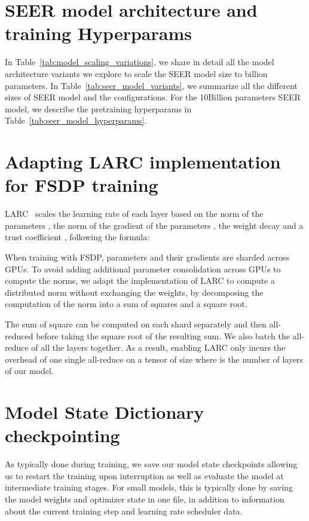 \documentclass[10pt,twocolumn,letterpaper]{article}
\begin{document}
\section{SEER model architecture and training Hyperparams}
\label{sec:appendix_models_seer}

In Table~\ref{tab:model_scaling_variations}, we share in detail all the model architecture variants we explore to scale the SEER model size to billion parameters. In Table~\ref{tab:seer_model_variants}, we summarize all the different sizes of SEER model and the configurations. For the 10Billion parameters SEER model, we describe the pretraining hyperparams in Table~\ref{tab:seer_model_hyperparams}.



\section{Adapting LARC implementation for FSDP training}
\label{sec:appendix_larc_adaptation}

LARC~\cite{you2017large} scales the learning rate of each layer  based on the norm of the parameters , the norm of the gradient of the parameters , the weight decay  and a trust coefficient , following the formula:



When training with FSDP, parameters and their gradients are sharded across GPUs. To avoid adding additional parameter consolidation across GPUs to compute the norms, we adapt the implementation of LARC to compute a distributed norm without exchanging the weights, by decomposing the computation of the norm into a sum of squares and a square root.

The sum of square can be computed on each shard separately and then all-reduced before taking the square root of the resulting sum. We also batch the all-reduce of all the layers together. As a result, enabling LARC only incurs the overhead of one single all-reduce on a tensor of size  where  is the number of layers of our model.



\section{Model State Dictionary checkpointing}
\label{sec:appendix_model_state_dict}

As typically done during training, we save our model state checkpoints allowing us to restart the training upon interruption as well as evaluate the model at intermediate training stages. For small models, this is typically done by saving the model weights and optimizer state in one file, in addition to information about the current training step and learning rate scheduler data.
\end{document}
